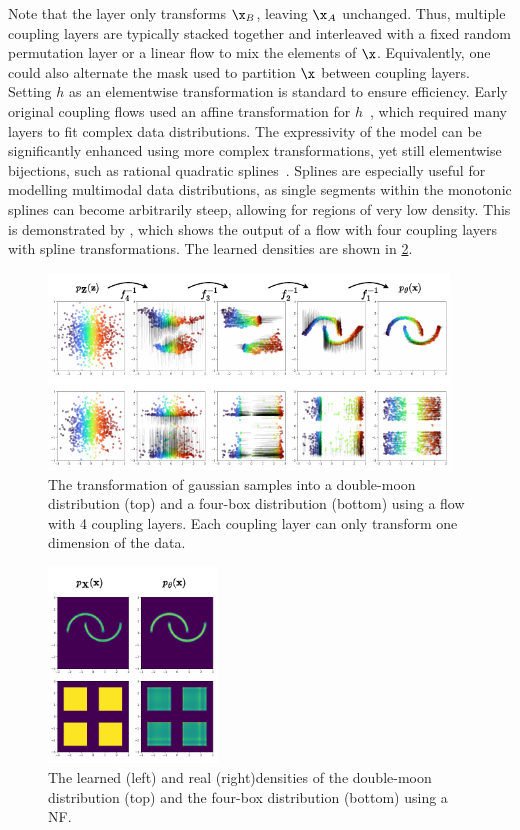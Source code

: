 Note that the layer only transforms $\x_B$, leaving $\x_A$ unchanged.
Thus, multiple coupling layers are typically stacked together and interleaved with a fixed random permutation layer or a linear flow to mix the elements of $\x$.
Equivalently, one could also alternate the mask used to partition $\x$ between coupling layers.
Setting $h$ as an elementwise transformation is standard to ensure efficiency.
Early original coupling flows used an affine transformation for $h$~\cite{RealNVP}, which required many layers to fit complex data distributions.
The expressivity of the model can be significantly enhanced using more complex transformations, yet still elementwise bijections, such as rational quadratic splines~\cite{NeuralSplineFlows}.
Splines are especially useful for modelling multimodal data distributions, as single segments within the monotonic splines can become arbitrarily steep, allowing for regions of very low density.
This is demonstrated by , which shows the output of a flow with four coupling layers with spline transformations.
The learned densities are shown in \cref{fig:density}.

\begin{figure}[ht]
    \centering
    \includegraphics[width=0.95\textwidth]{Figures/generative_models/samples.pdf}
    \caption{The transformation of gaussian samples into a double-moon distribution (top) and a four-box distribution (bottom) using a flow with 4 coupling layers. Each coupling layer can only transform one dimension of the data.}
    \label{fig:samples}
\end{figure}

\begin{figure}[ht]
    \centering
    \includegraphics[width=0.4\textwidth]{Figures/generative_models/densities.pdf}
    \caption{The learned (left) and real (right)densities of the double-moon distribution (top) and the four-box distribution (bottom) using a NF.}
    \label{fig:density}
\end{figure}

